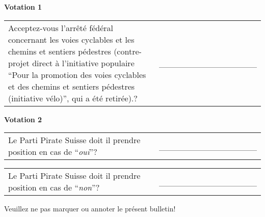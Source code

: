 \documentclass[11pt, a4paper]{scrartcl}
\newcommand{\oui}{\enquote{\textit{oui}}}
\newcommand{\non}{\enquote{\textit{non}}}
\begin{document}
{\begin{minipage}[t][12.5cm][t]{17.7cm}
\vspace{1cm}

\textbf{Votation 1}

\vspace{0.5cm}

\begin{tabular}{ b{13.5cm} b{3cm} }
Acceptez-vous l'arrêté fédéral concernant les voies cyclables et les chemins et sentiers pédestres (contre-projet direct à l’initiative populaire \enquote{Pour la promotion des voies cyclables et des chemins et sentiers pédestres (initiative vélo)}, qui a été retirée).?
& \_\_\_\_\_\_\_\_\_\_\_\_\_\_\_\_ \\
\end{tabular}

\vspace{0.5cm}

\textbf{Votation 2}

\vspace{0.5cm}

\begin{tabular}{ b{13.5cm} b{3cm} }
Le Parti Pirate Suisse doit il prendre position en cas de \oui{}?
& \_\_\_\_\_\_\_\_\_\_\_\_\_\_\_\_ \\
\end{tabular}

\vspace{0.5cm}

\begin{tabular}{ b{13.5cm} b{3cm} }
Le Parti Pirate Suisse doit il prendre position en cas de \non{}?
& \_\_\_\_\_\_\_\_\_\_\_\_\_\_\_\_ \\
\end{tabular}

\vspace{0.5cm}

Veuillez ne pas marquer ou annoter le présent bulletin!


\end{minipage}


}
\end{document}
